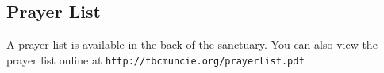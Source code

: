 \vspace{\fill}

\subsection{Prayer List}
\label{prayerlist}

A prayer list is available in the back of the sanctuary. You can also view the prayer list online at  \texttt{http://fbcmuncie.org/prayerlist.pdf} 

\vspace{\fill}
